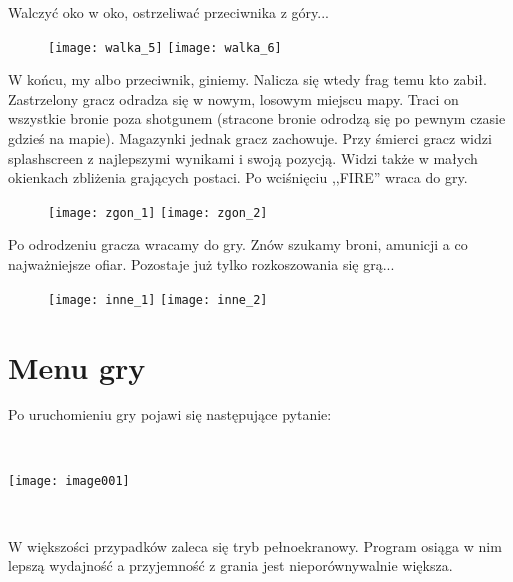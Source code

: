 \documentclass[licencjacka]{pracamgr}
\begin{document}
Walczyć oko w oko, ostrzeliwać przeciwnika z góry...

\begin{figure}[htb]
\begin{center}
\texttt{[image: walka\_5]}
\texttt{[image: walka\_6]}
\end{center}
\end{figure}

\newpage

W końcu, my albo przeciwnik, giniemy. Nalicza się wtedy frag temu
kto zabił. Zastrzelony gracz odradza się w nowym, losowym miejscu mapy.
Traci on wszystkie bronie poza shotgunem (stracone bronie odrodzą się po pewnym czasie
gdzieś na mapie). Magazynki jednak gracz zachowuje. Przy śmierci gracz widzi
splashscreen z najlepszymi wynikami i swoją pozycją. Widzi także w małych okienkach zbliżenia
grających postaci. Po wciśnięciu ,,FIRE'' wraca do gry.

\begin{figure}[htb]
\begin{center}
\texttt{[image: zgon\_1]}
\texttt{[image: zgon\_2]}
\end{center}
\end{figure}

Po odrodzeniu gracza wracamy do gry. Znów szukamy broni, amunicji a co najważniejsze ofiar.
Pozostaje już tylko rozkoszowania się grą...

\begin{figure}[htb]
\begin{center}
\texttt{[image: inne\_1]}
\texttt{[image: inne\_2]}
\end{center}
\end{figure}

\newpage

\section{Menu gry}

Po uruchomieniu gry pojawi się następujące pytanie:

\begin{center}
\ \

\texttt{[image: image001]}
\end{center}

\ \

W większości przypadków zaleca się tryb pełnoekranowy. Program osiąga w nim lepszą wydajność a przyjemność z grania jest nieporównywalnie większa.
\end{document}
